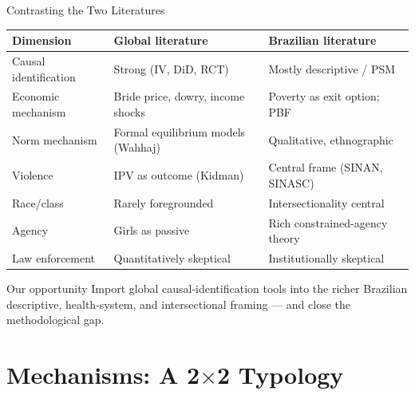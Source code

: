 \documentclass[aspectratio=169,10pt]{beamer}
\begin{document}
\begin{frame}{Contrasting the Two Literatures}
    \begin{tabular}{p{4cm} p{5cm} p{5cm}}
        \toprule
        \textbf{Dimension} & \textbf{Global literature} & \textbf{Brazilian literature} \\
        \midrule
        Causal identification & Strong (IV, DiD, RCT) & Mostly descriptive / PSM \\
        Economic mechanism & Bride price, dowry, income shocks & Poverty as exit option; PBF \\
        Norm mechanism & Formal equilibrium models (Wahhaj) & Qualitative, ethnographic \\
        Violence & IPV as outcome (Kidman) & Central frame (SINAN, SINASC) \\
        Race/class & Rarely foregrounded & Intersectionality central \\
        Agency & Girls as passive & Rich constrained-agency theory \\
        Law enforcement & Quantitatively skeptical & Institutionally skeptical \\
        \bottomrule
    \end{tabular}
    \vspace{0.3cm}
    \begin{block}{Our opportunity}
        Import global causal-identification tools into the richer Brazilian descriptive, health-system, and intersectional framing --- and close the methodological gap.
    \end{block}
\end{frame}

\section{Mechanisms: A 2$\times$2 Typology}
\end{document}
